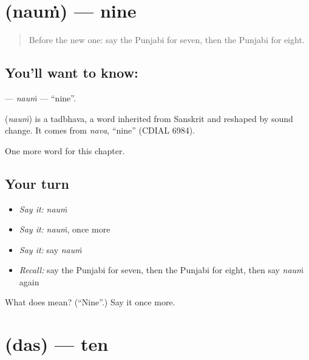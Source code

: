 \section[\texorpdfstring{\pa{ਨੌਂ} (nauṁ)}{ਨੌਂ (nauṁ)}]{ (nauṁ) — nine}

\label{lesson:PA-C95-naum}



\begin{quote}
Before the new one: say the Punjabi for seven, then the Punjabi for eight.
\end{quote}

\subsection*{You'll want to know: }
\textbf{} — \emph{nauṁ} — \textquotedblleft{}nine\textquotedblright{}.

\begin{cousinweb}
\textbf{} (\emph{nauṁ}) is a tadbhava, a word inherited from Sanskrit and reshaped by sound change. It comes from \emph{nava}, \textquotedblleft{}nine\textquotedblright{} (CDIAL 6984).
\end{cousinweb}

\begin{grammarlens}[title={What you've built}]
One more word for this chapter.
\end{grammarlens}

\subsection*{Your turn}
\begin{itemize}
\raggedright
  \item \emph{Say it:} \emph{nauṁ}
  \item \emph{Say it:} \emph{nauṁ}, once more
  \item \emph{Say it:} say \emph{nauṁ}
  \item \emph{Recall:} say the Punjabi for seven, then the Punjabi for eight, then say \emph{nauṁ} again
\end{itemize}

\begin{tcolorbox}[breakable,colback=teal!4,colframe=teal!35!black,title={Before you move on}]
What does  mean? (\textquotedblleft{}Nine\textquotedblright{}.) Say it once more.
\end{tcolorbox}
\section[\texorpdfstring{\pa{ਦਸ} (das)}{ਦਸ (das)}]{ (das) — ten}

